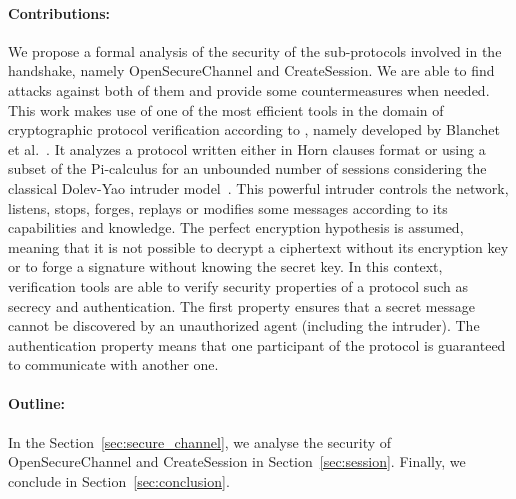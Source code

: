 \paragraph{Contributions:}

We propose a formal analysis of the security of
the sub-protocols involved in the \opcua handshake, namely \opcua
OpenSecureChannel and \opcua CreateSession.  We are able to find
attacks against both of them and provide some countermeasures when
needed.  This work makes use of one of the most efficient tools in the
domain of cryptographic protocol verification according
to \cite{LP15}, namely \proverif developed by Blanchet et al.~\cite{Bla01}.
It analyzes a protocol written either in Horn clauses format or using
a subset of the Pi-calculus for an unbounded number of sessions
considering the classical Dolev-Yao intruder model~\cite{DY81}.  This
powerful intruder controls the network, listens, stops, forges,
replays or modifies some messages according to its capabilities and
knowledge.  The perfect encryption hypothesis is assumed, meaning that
it is not possible to decrypt a ciphertext without its encryption key
or to forge a signature without knowing the secret key.  In this
context, verification tools are able to verify security properties of
a protocol such as secrecy and authentication.  The first property
ensures that a secret message cannot be discovered by an unauthorized
agent (including the intruder).  The authentication property means
that one participant of the protocol is guaranteed to communicate with
another one.

\paragraph{Outline:} In the Section~\ref{sec:secure_channel}, we analyse the
security of \opcua OpenSecureChannel and 
\opcua CreateSession in Section~\ref{sec:session}. Finally, we conclude in Section~\ref{sec:conclusion}.
